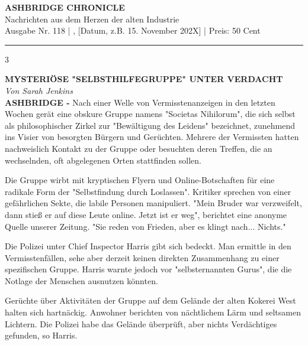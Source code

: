\documentclass[10pt, a4paper]{article}
\begin{document}
\frenchspacing
\begin{center}
    \fontsize{36}{42}\selectfont \textbf{ASHBRIDGE CHRONICLE} \\
    \large Nachrichten aus dem Herzen der alten Industrie \\
    \normalsize Ausgabe Nr. 118 \quad | \quad [Wochentag], [Datum, z.B. 15. November 202X] \quad | \quad Preis: 50 Cent %
\end{center}
\vspace{0.5em}
\rule{\linewidth}{1pt}
\vspace{1em}

\begin{multicols}{3}

\large \textbf{MYSTERIÖSE "SELBSTHILFEGRUPPE" UNTER VERDACHT} \normalsize \\
\small \textit{Von Sarah Jenkins} \normalsize \\

\textbf{ASHBRIDGE -} Nach einer Welle von Vermisstenanzeigen in den letzten Wochen gerät eine obskure Gruppe namens "Societas Nihilorum", die sich selbst als philosophischer Zirkel zur "Bewältigung des Leidens" bezeichnet, zunehmend ins Visier von besorgten Bürgern und Gerüchten. Mehrere der Vermissten hatten nachweislich Kontakt zu der Gruppe oder besuchten deren Treffen, die an wechselnden, oft abgelegenen Orten stattfinden sollen.

Die Gruppe wirbt mit kryptischen Flyern und Online-Botschaften für eine radikale Form der "Selbstfindung durch Loslassen". Kritiker sprechen von einer gefährlichen Sekte, die labile Personen manipuliert. "Mein Bruder war verzweifelt, dann stieß er auf diese Leute online. Jetzt ist er weg", berichtet eine anonyme Quelle unserer Zeitung. "Sie reden von Frieden, aber es klingt nach... Nichts."

Die Polizei unter Chief Inspector Harris gibt sich bedeckt. Man ermittle in den Vermisstenfällen, sehe aber derzeit keinen direkten Zusammenhang zu einer spezifischen Gruppe. Harris warnte jedoch vor "selbsternannten Gurus", die die Notlage der Menschen ausnutzen könnten.

Gerüchte über Aktivitäten der Gruppe auf dem Gelände der alten Kokerei West halten sich hartnäckig. Anwohner berichten von nächtlichem Lärm und seltsamen Lichtern. Die Polizei habe das Gelände überprüft, aber nichts Verdächtiges gefunden, so Harris.

\begin{center}
\end{center}


\end{multicols}
\end{document}

